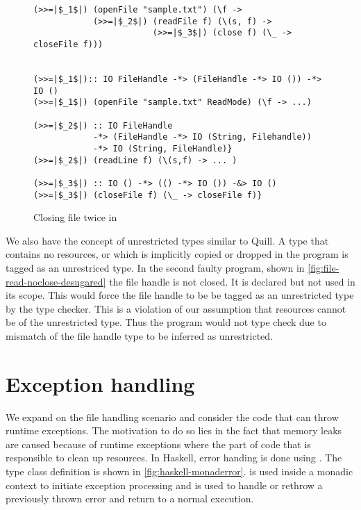 \begin{figure}[h]
\begin{framed}
\begin{verbatim}
(>>=|$_1$|) (openFile "sample.txt") (\f ->
            (>>=|$_2$|) (readFile f) (\(s, f) ->
                        (>>=|$_3$|) (close f) (\_ -> closeFile f)))


(>>=|$_1$|):: IO FileHandle -*> (FileHandle -*> IO ()) -*> IO ()
(>>=|$_1$|) (openFile "sample.txt" ReadMode) (\f -> ...)

(>>=|$_2$|) :: IO FileHandle
            -*> (FileHandle -*> IO (String, Filehandle))
            -*> IO (String, FileHandle)}
(>>=|$_2$|) (readLine f) (\(s,f) -> ... )

(>>=|$_3$|) :: IO () -*> (() -*> IO ()) -&> IO ()
(>>=|$_3$|) (closeFile f) (\_ -> closeFile f)}
\end{verbatim}
\end{framed}
\caption{Closing file twice in \qub{}}
\label{fig:qub-close-file-twice}
\end{figure}

We also have the concept of unrestricted types similar to Quill. A type that contains no resources, or which is implicitly
copied or dropped in the program is tagged as an unrestriced type. In the second faulty program,
shown in \cref{fig:file-read-noclose-desugared} the file handle  is not closed.
It is declared but not used in its scope. This would force the file handle to be be tagged as an unrestricted type by the \qub{} type checker.
This is a violation of our assumption that resources cannot be of the unrestricted type. Thus
the program would not type check due to mismatch of the file handle type to be inferred as unrestricted.

\section{Exception handling}
We expand on the file handling scenario and consider the code that can throw runtime exceptions.
The motivation to do so lies in the fact that memory leaks are caused because of runtime
exceptions where the part of code that is responsible to clean up resources. In Haskell, error handing is done using \citep{liang_monad_1995}.
The type class definition is shown in \cref{fig:haskell-monaderror}.  is used inside a monadic context to initiate
exception processing and  is used to handle or rethrow a previously thrown error and return
to a normal execution.

